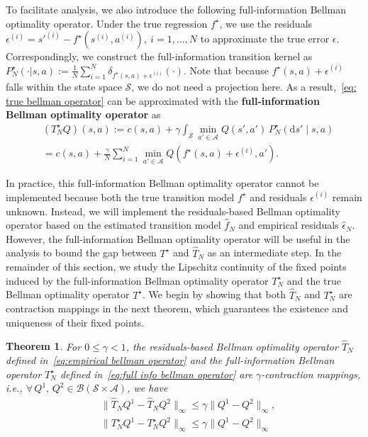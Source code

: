 \documentclass[letterpaper, 10 pt, conference]{ieeeconf}  %
\newtheorem{theorem}{Theorem}
\begin{document}
To facilitate analysis, we also introduce the following full-information Bellman optimality operator. Under the true regression $f^\star$, we use the residuals $\epsilon^{(i)} = s'^{(i)} - f^\star(s^{(i)},a^{(i)}),\ i=1,\ldots, N$ to approximate the true error $\epsilon$. Correspondingly, we construct the full-information transition kernel as $P_N^\star(\cdot|s,a)
:=\frac{1}{N}\sum_{i=1}^{N}\delta_{f^\star(s,a)+\epsilon^{(i)}}(\cdot)$. Note that because $f^\star(s,a)+\epsilon^{(i)}$ falls within the state space $\mathcal S$, we do not need a projection here. As a result,\ \eqref{eq: true bellman operator} can be approximated with the \textbf{full-information Bellman optimality operator} as
\allowdisplaybreaks
\begin{align}\label{eq:full info bellman operator}
&(T_N^\star Q)(s,a)
:= c(s,a) + \gamma \int_{\mathcal S} \min_{a'\in\mathcal A} Q(s',a')\,
P_N^\star(\mathrm ds'\mid s,a) \nonumber \\
&=  c(s,a) + \frac{\gamma}{N} \sum_{i=1}^N \min_{a' \in \mathcal A} Q(f^\star(s,a)+\epsilon^{(i)}
,a').
\end{align}


In practice, this full-information Bellman optimality operator cannot be implemented because both the true transition model $f^\star$ and residuals $\epsilon^{(i)}$ remain unknown. Instead, we will implement the residuals-based Bellman optimality operator based on the estimated transition model $\hat{f}_N$ and empirical residuals $\hat{\epsilon}_N$. However, the full-information Bellman optimality operator will be useful in the analysis to bound the gap between $T^\star$ and $\hat{T}_N$ as an intermediate step. In the remainder of this section, we study the Lipschitz continuity of the fixed points induced by the full-information Bellman optimality operator $T_N^\star$ and the true Bellman optimality operator $T^\star$. We begin by showing that both $\hat{T}_N$ and $T_N^\star$ are contraction mappings in the next theorem, which guarantees the existence and uniqueness of their fixed points. 

\begin{theorem}\label{thm:contraction}
For $0\le \gamma<1$, the residuals-based Bellman optimality operator $\hat{T}_N$ defined in\ \eqref{eq:empirical bellman operator} and the full-information Bellman operator $T^\star_N$ defined in\ \eqref{eq:full info bellman operator} are $\gamma$-contraction mappings, i.e., $\forall\, Q^{1},\, Q^{2} \in \mathcal{B}(\mathcal{S}\times\mathcal{A})$, we have
\begin{align*}
&\|\hat{T}_N Q^{1}-\hat{T}_N Q^{2}\|_\infty
\le \gamma \|Q^{1}-Q^{2}\|_\infty,\\
&\|T_N^\star Q^{1}-T_N^\star Q^{2}\|_\infty
\le \gamma \|Q^{1}-Q^{2}\|_\infty 
\end{align*}
\end{theorem}
\end{document}

